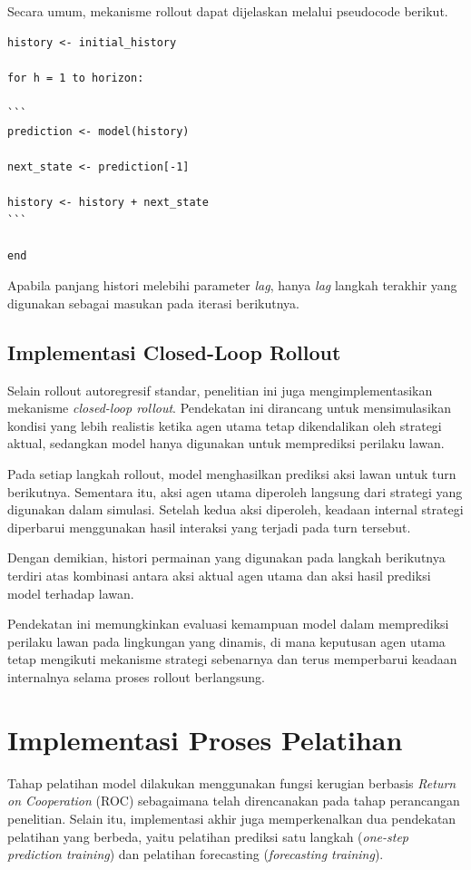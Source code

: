 Secara umum, mekanisme rollout dapat dijelaskan melalui pseudocode berikut.

\begin{verbatim}
history <- initial_history

for h = 1 to horizon:

```
prediction <- model(history)

next_state <- prediction[-1]

history <- history + next_state
```

end
\end{verbatim}

Apabila panjang histori melebihi parameter \textit{lag}, hanya \textit{lag} langkah terakhir yang digunakan sebagai masukan pada iterasi berikutnya.

\subsection{Implementasi Closed-Loop Rollout}

Selain rollout autoregresif standar, penelitian ini juga mengimplementasikan mekanisme \textit{closed-loop rollout}. Pendekatan ini dirancang untuk mensimulasikan kondisi yang lebih realistis ketika agen utama tetap dikendalikan oleh strategi aktual, sedangkan model hanya digunakan untuk memprediksi perilaku lawan.

Pada setiap langkah rollout, model menghasilkan prediksi aksi lawan untuk turn berikutnya. Sementara itu, aksi agen utama diperoleh langsung dari strategi yang digunakan dalam simulasi. Setelah kedua aksi diperoleh, keadaan internal strategi diperbarui menggunakan hasil interaksi yang terjadi pada turn tersebut.

Dengan demikian, histori permainan yang digunakan pada langkah berikutnya terdiri atas kombinasi antara aksi aktual agen utama dan aksi hasil prediksi model terhadap lawan.

Pendekatan ini memungkinkan evaluasi kemampuan model dalam memprediksi perilaku lawan pada lingkungan yang dinamis, di mana keputusan agen utama tetap mengikuti mekanisme strategi sebenarnya dan terus memperbarui keadaan internalnya selama proses rollout berlangsung.


\section{Implementasi Proses Pelatihan}

Tahap pelatihan model dilakukan menggunakan fungsi kerugian berbasis \textit{Return on Cooperation} (ROC) sebagaimana telah direncanakan pada tahap perancangan penelitian. Selain itu, implementasi akhir juga memperkenalkan dua pendekatan pelatihan yang berbeda, yaitu pelatihan prediksi satu langkah (\textit{one-step prediction training}) dan pelatihan forecasting (\textit{forecasting training}).

